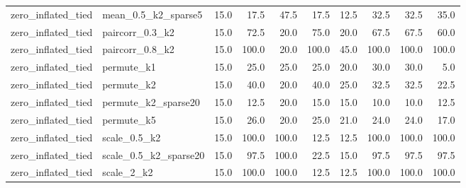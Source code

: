 \begin{table}[!tp]
{\begin{tabular}{llrrrrrrrr}
zero\_inflated\_tied & mean\_0.5\_k2\_sparse5 & 15.0 & 17.5 & 47.5 & 17.5 & 12.5 & 32.5 & 32.5 & 35.0 \\
zero\_inflated\_tied & paircorr\_0.3\_k2 & 15.0 & 72.5 & 20.0 & 75.0 & 20.0 & 67.5 & 67.5 & 60.0 \\
zero\_inflated\_tied & paircorr\_0.8\_k2 & 15.0 & 100.0 & 20.0 & 100.0 & 45.0 & 100.0 & 100.0 & 100.0 \\
zero\_inflated\_tied & permute\_k1 & 15.0 & 25.0 & 25.0 & 25.0 & 20.0 & 30.0 & 30.0 & 5.0 \\
zero\_inflated\_tied & permute\_k2 & 15.0 & 40.0 & 20.0 & 40.0 & 25.0 & 32.5 & 32.5 & 22.5 \\
zero\_inflated\_tied & permute\_k2\_sparse20 & 15.0 & 12.5 & 20.0 & 15.0 & 15.0 & 10.0 & 10.0 & 12.5 \\
zero\_inflated\_tied & permute\_k5 & 15.0 & 26.0 & 20.0 & 25.0 & 21.0 & 24.0 & 24.0 & 17.0 \\
zero\_inflated\_tied & scale\_0.5\_k2 & 15.0 & 100.0 & 100.0 & 12.5 & 12.5 & 100.0 & 100.0 & 100.0 \\
zero\_inflated\_tied & scale\_0.5\_k2\_sparse20 & 15.0 & 97.5 & 100.0 & 22.5 & 15.0 & 97.5 & 97.5 & 97.5 \\
zero\_inflated\_tied & scale\_2\_k2 & 15.0 & 100.0 & 100.0 & 12.5 & 12.5 & 100.0 & 100.0 & 100.0 \\
\bottomrule
\end{tabular}
}
\end{table}

